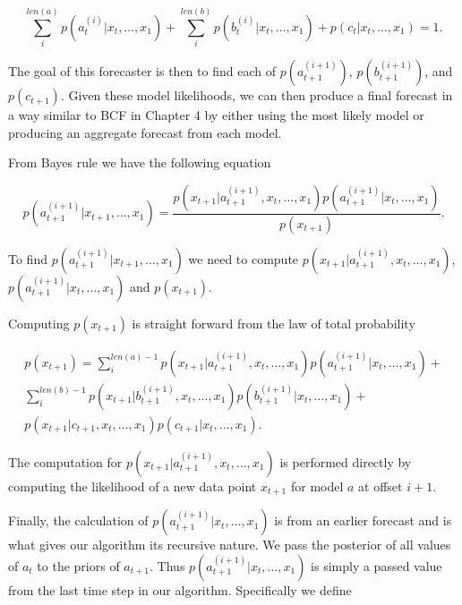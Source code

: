 \begin{equation}
\sum_{i}^{len(a)} p(a_{t}^{(i)}|x_{t}, \ldots, x_{1}) + \sum_{i}^{len(b)} p(b_{t}^{(i)}|x_{t}, \ldots, x_{1}) + p(c_{t}|x_{t}, \ldots, x_{1}) = 1.
\label{eq:pabc}
\end{equation}

The goal of this forecaster is then to find each of $p(a_{t + 1}^{(i + 1)})$, $p(b_{t + 1}^{(i + 1)})$, and $p(c_{t + 1}).$  Given these model likelihoods, we can then produce a final forecast in a way similar to BCF in Chapter 4 by either using the most likely model or producing an aggregate forecast from each model.

From Bayes rule we have the following equation 

\begin {equation}
p(a_{t + 1}^{(i + 1)}|x_{t + 1}, \ldots, x_{1}) =
		\frac{p(x_{t + 1}|a^{(i + 1)}_{t + 1}, x_{t}, \ldots, x_{1}) p(a_{t + 1}^{(i + 1)}|x_{t}, \ldots, x_{1})}
	       {p(x_{t + 1})}.
\label{eq:update_bayes}
\end{equation}

To find $p(a_{t + 1}^{(i + 1)}|x_{t + 1}, \ldots, x_{1})$ we need to compute $p(x_{t + 1}|a^{(i + 1)}_{t + 1}, x_{t}, \ldots, x_{1})$,  $p(a_{t + 1}^{(i + 1)}|x_{t}, \ldots, x_{1})$ and $p(x_{t + 1})$.

Computing $p(x_{t + 1})$ is straight forward from the law of total probability

\begin{equation}
	\begin{split}
		p(x_{t + 1}) = \sum_{i}^{len(a) - 1}p(x_{t + 1}|a_{t + 1}^{(i + 1)}, x_{t}, \ldots, x_{1})
						   p(a_{t + 1}^{(i + 1)}|x_{t}, \ldots, x_{1}) + \\
				      \sum_{i}^{len(b) - 1}p(x_{t + 1}|b_{t + 1}^{(i + 1)}, x_{t}, \ldots, x_{1}) 
						   p(b_{t + 1}^{(i + 1)}|x_{t}, \ldots, x_{1}) + \\
	        			      p(x_{t + 1}|c_{t + 1}, x_{t}, \ldots, x_{1})p(c_{t + 1}|x_{t}, \ldots, x_{1}).
	\end{split}
\end{equation}

The computation for $p(x_{t + 1}|a^{(i + 1)}_{t + 1}, x_{t}, \ldots, x_{1})$ is performed directly by computing the likelihood of a new data point $x_{t + 1}$ for model $a$ at offset $i + 1$.

Finally, the calculation of $p(a_{t + 1}^{(i + 1)}|x_{t}, \ldots, x_{1})$ is from an earlier forecast and is what gives our algorithm its recursive nature.  We pass the posterior of all values of $a_{t}$ to the priors of $a_{t + 1}.$  Thus $p(a_{t + 1}^{(i + 1)}|x_{t}, \ldots, x_{1})$ is simply a passed value from the last time step in our algorithm.  Specifically we define 

